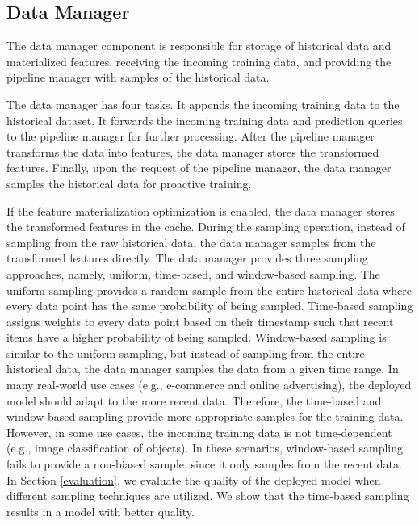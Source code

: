 \subsection{Data Manager} \label{data-manager}
The data manager component is responsible for storage of historical data and materialized features, receiving the incoming training data, and providing the pipeline manager with samples of the historical data.

The data manager has four tasks.
It appends the incoming training data to the historical dataset.
It forwards the incoming training data and prediction queries to the pipeline manager for further processing.
After the pipeline manager transforms the data into features, the data manager stores the transformed features.
Finally, upon the request of the pipeline manager, the data manager samples the historical data for proactive training.

If the feature materialization optimization is enabled, the data manager stores the transformed features in the cache.
During the sampling operation, instead of sampling from the raw historical data, the data manager samples from the transformed features directly.
The data manager provides three sampling approaches, namely, uniform, time-based, and window-based sampling.
The uniform sampling provides a random sample from the entire historical data where every data point has the same probability of being sampled.
Time-based sampling assigns weights to every data point based on their timestamp such that recent items have a higher probability of being sampled.
Window-based sampling is similar to the uniform sampling, but instead of sampling from the entire historical data, the data manager samples the data from a given time range. 
In many real-world use cases (e.g., e-commerce and online advertising), the deployed model should adapt to the more recent data.
Therefore, the time-based and window-based sampling provide more appropriate samples for the training data.
However, in some use cases, the incoming training data is not time-dependent (e.g., image classification of objects).
In these scenarios, window-based sampling fails to provide a non-biased sample, since it only samples from the recent data.
In Section \ref{evaluation}, we evaluate the quality of the deployed model when different sampling techniques are utilized.
We show that the time-based sampling results in a model with better quality.

